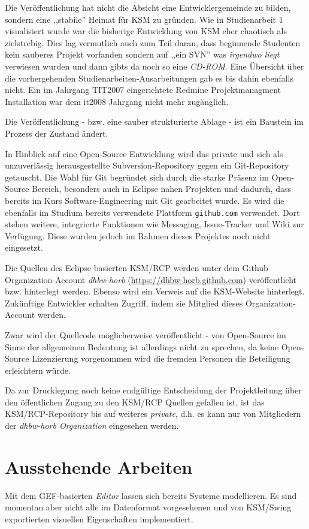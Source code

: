 \documentclass[%
12pt,titlepage,abstracton,DIV=10]{scrreprt}
\begin{document}
Die Veröffentlichung hat nicht die Absicht eine Entwicklergemeinde zu bilden,
sondern eine ,,stabile'' Heimat für KSM zu gründen. Wie in Studienarbeit 1
visualisiert wurde \cite[S. 2]{fischer10} war die bisherige Entwicklung von KSM
eher chaotisch als zielstrebig. Dies lag vermutlich auch zum Teil daran, dass
beginnende Studenten kein sauberes Projekt vorfanden sondern auf ,,ein SVN'' was
\textit{irgendwo liegt} verwiesen wurden und dann gibts da noch so eine
\textit{CD-ROM}. Eine Übersicht über die vorhergehenden
Studienarbeiten-Ausarbeitungen gab es bis dahin ebenfalls nicht. Ein im Jahrgang
\textsc{TIT2007} eingerichtete Redmine Projektmanagment Installation war dem
it2008 Jahrgang nicht mehr zugänglich.

Die Veröffentlichung - bzw. eine sauber strukturierte Ablage - ist ein Baustein
im Prozess der Zustand ändert.

In Hinblick auf eine Open-Source Entwicklung wird das private und sich als
unzuverlässig herausgestellte Subversion-Repository gegen ein Git-Repository
getauscht. Die Wahl für Git begründet sich durch die starke Präsenz im
Open-Source Bereich, besonders auch in Eclipse nahen Projekten und dadurch, dass
bereits im Kurs Software-Engineering mit Git gearbeitet wurde. Es wird die
ebenfalls im Studium bereits verwendete Plattform \texttt{github.com} verwendet.
Dort stehen weitere, integrierte Funktionen wie Messaging, Issue-Tracker und
Wiki zur Verfügung. Diese wurden jedoch im Rahmen dieses Projektes noch nicht
eingesetzt.

Die Quellen des Eclipse basierten KSM/RCP werden unter dem Github
Organization-Account \textit{dhbw-horb}
({\small\url{https://dhbw-horb.github.com}}) veröffentlicht bzw. hinterlegt
werden. Ebenso wird ein Verweis auf die KSM-Website hinterlegt. Zukünftige
Entwickler erhalten Zugriff, indem sie Mitglied dieses Organization-Account
werden.

Zwar wird der Quellcode möglicherweise veröffentlicht - von Open-Source im Sinne
der allgemeinen Bedeutung ist allerdings nicht zu sprechen, da keine Open-Source
Lizenzierung vorgenommen wird die fremden Personen die Beteiligung erleichtern
würde.

Da zur Drucklegung noch keine endgültige Entscheidung der Projektleitung über
den öffentlichen Zugang zu den KSM/RCP Quellen gefallen ist, ist das
KSM/RCP-Repository bis auf weiteres \textit{private}, d.h. es kann nur von
Mitgliedern der \textit{dhbw-horb Organization} eingesehen werden.


\section{Ausstehende Arbeiten}
Mit dem GEF-basierten \emph{Editor} lassen sich bereits Systeme modellieren. Es
sind momentan aber nicht alle im Datenformat vorgesehenen und von KSM/Swing
exportierten visuellen Eigenschaften implementiert.
\end{document}

